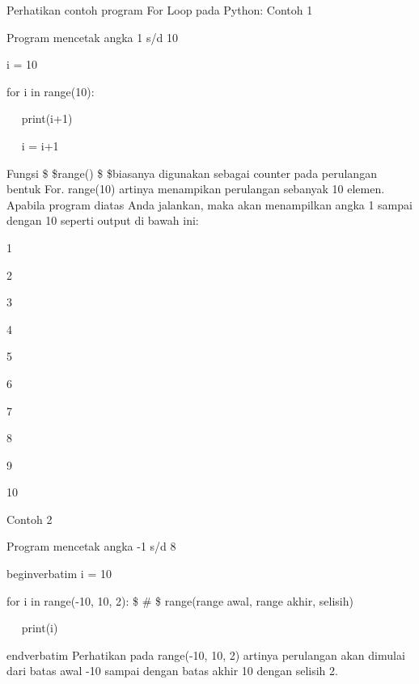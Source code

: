 Perhatikan contoh program For Loop pada Python:\vspace{\baselineskip}
\vspace{\baselineskip}
Contoh 1\vspace{\baselineskip}
\vspace{\baselineskip}
 \par
Program mencetak angka 1 s/d 10 \par
\vspace{12pt}
i = 10 \par
for i in range(10): \par
~~ print(i+1) \par
~~ i = i+1 \par
\vspace{\baselineskip}
Fungsi \$  \$range() \$  \$biasanya digunakan sebagai counter pada perulangan bentuk For. range(10) artinya menampikan perulangan sebanyak 10 elemen.\vspace{\baselineskip}
\vspace{\baselineskip}
Apabila program diatas Anda jalankan, maka akan menampilkan angka 1 sampai dengan 10 seperti output di bawah ini:\vspace{\baselineskip}
\vspace{\baselineskip}
 \par
1 \par
2 \par
3 \par
4 \par
5 \par
6 \par
7 \par
8 \par
9 \par
10 \par
\vspace{\baselineskip}
Contoh 2\vspace{\baselineskip}
\vspace{\baselineskip}
 \par
 Program mencetak angka -1 s/d 8 \par
\vspace{12pt}
begin{verbatim}
i = 10 \par
for i in range(-10, 10, 2):  \$  \#  \$ range(range awal, range akhir, selisih) \par
~~ print(i) \par
end{verbatim}
\vspace{12pt}
\vspace{\baselineskip}
Perhatikan pada range(-10, 10, 2) artinya perulangan akan dimulai dari batas awal -10 sampai dengan batas akhir 10 dengan selisih 2.\vspace{\baselineskip}
